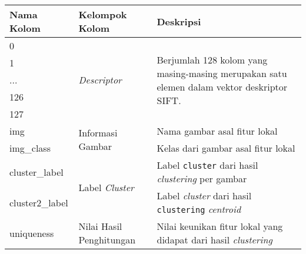 \begin{table}[H]
	\begin{tabular}{|p{}|p{}|p{}|}
		\hline
		\textbf{Nama Kolom}      & \textbf{Kelompok Kolom}                            & \textbf{Deskripsi}                                                                                                   \\ \hline
		0               & \multirow{5}{0.45\textwidth}{\textit{Descriptor}}               & \multirow{5}{0.45\textwidth}{Berjumlah 128 kolom yang masing-masing merupakan satu elemen dalam vektor deskriptor SIFT.} \\ \cline{1-1}
		1               &                                           &                                                                                                             \\ \cline{1-1}
		...             &                                           &                                                                                                             \\ \cline{1-1}
		126             &                                           &                                                                                                             \\ \cline{1-1}
		127             &                                           &                                                                                                             \\ \hline
		img             & \multirow{2}{*}{Informasi Gambar}         & Nama gambar asal fitur lokal                                                                                \\ \cline{1-1} \cline{3-3} 
		img\_class      &                                           & Kelas dari gambar asal fitur lokal                                                                          \\ \hline
		cluster\_label  & \multirow{2}{*}{Label \textit{Cluster}}            & Label \texttt{cluster} dari hasil \textit{clustering} per gambar                                                              \\ \cline{1-1} \cline{3-3} 
		cluster2\_label &                                           & Label \textit{cluster} dari hasil \texttt{clustering} \textit{centroid}                                                                \\ \hline
		uniqueness      & \multirow{2}{*}{Nilai Hasil Penghitungan} & Nilai keunikan fitur lokal yang didapat dari hasil \textit{clustering}                                               \\ \cline{1-1} \cline{3-3} 

\end{tabular}
\end{table}
